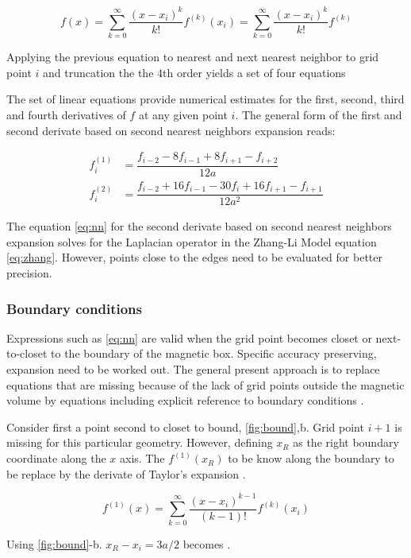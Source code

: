 $$f(x) = \sum\limits_{k=0}^{\infty} \dfrac{(x-x_i)^k}{k!}f^{(k)}(x_i) = \sum\limits_{k=0}^{\infty} \dfrac{(x-x_i)^k}{k!}f^{(k)}$$

Applying the previous equation to nearest and next nearest neighbor to grid point $i$ and truncation the the 4th order yields a set of four equations

The set of linear equations provide numerical estimates for the first, second, third and fourth derivatives of $f$ at any given point $i$. The general form of the first and second derivate based on second nearest neighbors expansion reads:

\begin{align} \label{eq:nn}
f^{(1)}_i &= \dfrac{f_{i-2}-8f_{i-1} + 8f_{i+1} - f_{i+2}}{12a} \\
f^{(2)}_i &= \dfrac{f_{i-2}+16f_{i-1} -30f_{i} + 16f_{i+1} - f_{i+1}}{12a^2}
\end{align}

The equation \ref{eq:nn} for the second derivate based on second nearest neighbors expansion solves for the Laplacian operator in the Zhang-Li Model equation \ref{eq:zhang}. However, points close to the edges need to be evaluated for better precision. 

\subsubsection{Boundary conditions}

Expressions such as \ref{eq:nn} are valid when the grid point becomes closet or next-to-closet to the boundary of the magnetic box. Specific accuracy preserving, expansion need to be worked out. The general present approach is to replace equations that are missing because of the lack of grid points outside the magnetic volume by equations including explicit reference to boundary conditions \cite{methods}.

Consider first a point second to closet to bound, \ref{fig:bound},b. Grid point $i + 1$ is missing for this particular geometry. However, defining $x_R$ as the right boundary coordinate along the $x$ axis. The $f^{(1)}(x_R)$ to be know along the boundary to be replace by the derivate of Taylor's expansion \cite{methods}.

\begin{equation} \label{eq:taylor}
f^{(1)}(x) = \sum\limits_{k=0}^{\infty} \dfrac{(x-x_i)^{k-1}}{(k - 1)!}f^{(k)}(x_i)
\end{equation}

Using \ref{fig:bound}-b. $x_R - x_i = 3a/2$ becomes \cite{methods}.

